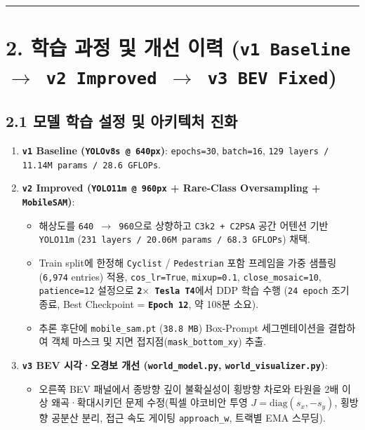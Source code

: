 \documentclass[10.5pt,a4paper]{article}
\begin{document}
\par\noindent\rule{\textwidth}{0.4pt}\par\medskip

\section{2. 학습 과정 및 개선 이력 (\texttt{v1 Baseline $\rightarrow$ v2 Improved $\rightarrow$ v3 BEV Fixed})}

\subsection{2.1 모델 학습 설정 및 아키텍처 진화}
\begin{enumerate}[leftmargin=1.8em,itemsep=2pt]
\item \textbf{\texttt{v1} Baseline (\texttt{YOLOv8s @ 640px})}: \texttt{epochs=30}, \texttt{batch=16}, \texttt{129 layers /\allowbreak{} 11.\allowbreak{}14M params /\allowbreak{} 28.\allowbreak{}6 GFLOPs}.
\item \textbf{\texttt{v2} Improved (\texttt{YOLO11m @ 960px} + Rare-Class Oversampling + \texttt{MobileSAM})}:
\begin{itemize}[leftmargin=1.5em,itemsep=2pt]
\item 해상도를 \texttt{640 $\rightarrow$ 960}으로 상향하고 \texttt{C3k2 + C2PSA} 공간 어텐션 기반 \texttt{YOLO11m} (\texttt{231 layers /\allowbreak{} 20.\allowbreak{}06M params /\allowbreak{} 68.\allowbreak{}3 GFLOPs}) 채택.
\item Train split에 한정해 \texttt{Cyclist} / \texttt{Pedestrian} 포함 프레임을 가중 샘플링(\texttt{6,\allowbreak{}974} entries) 적용, \texttt{cos\_\allowbreak{}lr=True}, \texttt{mixup=0.\allowbreak{}1}, \texttt{close\_\allowbreak{}mosaic=10}, \texttt{patience=12} 설정으로 \textbf{\texttt{2$\times$ Tesla T4}}에서 DDP 학습 수행 (\texttt{24 epoch} 조기 종료, Best Checkpoint = \textbf{\texttt{Epoch 12}}, 약 108분 소요).
\item 추론 후단에 \texttt{mobile\_\allowbreak{}sam.\allowbreak{}pt} (\texttt{38.\allowbreak{}8 MB}) Box-Prompt 세그멘테이션을 결합하여 객체 마스크 및 지면 접지점(\texttt{mask\_\allowbreak{}bottom\_\allowbreak{}xy}) 추출.
\end{itemize}
\item \textbf{\texttt{v3} BEV 시각·오경보 개선 (\texttt{world\_\allowbreak{}model.\allowbreak{}py}, \texttt{world\_\allowbreak{}visualizer.\allowbreak{}py})}:
\begin{itemize}[leftmargin=1.5em,itemsep=2pt]
\item 오른쪽 BEV 패널에서 종방향 깊이 불확실성이 횡방향 차로와 타원을 2배 이상 왜곡·확대시키던 문제 수정(픽셀 야코비안 투영 $J=\text{diag}(s_x,-s_y)$, 횡방향 공분산 분리, 접근 속도 게이팅 \texttt{approach\_\allowbreak{}w}, 트랙별 EMA 스무딩).
\end{itemize}
\end{enumerate}
\end{document}
